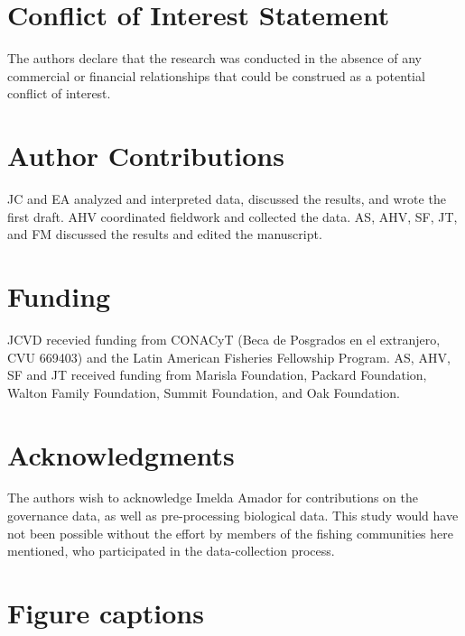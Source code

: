 \documentclass{frontiersSCNS}
\theoremstyle{definition}
\theoremstyle{definition}
\theoremstyle{definition}
\theoremstyle{remark}
\begin{document}
\section*{Conflict of Interest Statement}

The authors declare that the research was conducted in the absence of
any commercial or financial relationships that could be construed as a
potential conflict of interest.

\section*{Author Contributions}

JC and EA analyzed and interpreted data, discussed the results, and
wrote the first draft. AHV coordinated fieldwork and collected the data.
AS, AHV, SF, JT, and FM discussed the results and edited the manuscript.

\section*{Funding}

JCVD recevied funding from CONACyT (Beca de Posgrados en el extranjero,
CVU 669403) and the Latin American Fisheries Fellowship Program. AS,
AHV, SF and JT received funding from Marisla Foundation, Packard
Foundation, Walton Family Foundation, Summit Foundation, and Oak
Foundation.

\section*{Acknowledgments}

The authors wish to acknowledge Imelda Amador for contributions on the
governance data, as well as pre-processing biological data. This study
would have not been possible without the effort by members of the
fishing communities here mentioned, who participated in the
data-collection process.



\section*{Figure captions}
\end{document}
